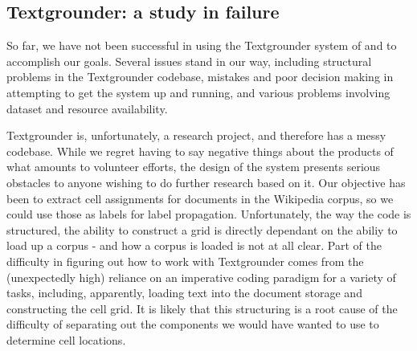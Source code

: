 \subsection{Textgrounder: a study in failure}
So far, we have not been successful in using the Textgrounder system of
\cite{wing-baldridge:11} and \cite{rolleretal:12} to accomplish our goals. 
Several issues stand in our way, including structural problems in the Textgrounder codebase, mistakes and poor decision making in attempting to get the system up and running, and various problems involving dataset and resource availability.
\par
Textgrounder is, unfortunately, a research project, and therefore has a messy
codebase.  
While we regret having to say negative things about the products of what
amounts to volunteer efforts, the design of the system presents serious
obstacles to anyone wishing to do further research based on it.
Our objective has been to extract cell assignments for documents in the
Wikipedia corpus, so we could use those as labels for label propagation.
Unfortunately, the way the code is structured, the ability to construct a grid
is directly dependant on the abiliy to load up a corpus - and how a corpus is
loaded is not at all clear.
Part of the difficulty in figuring out how to work with Textgrounder comes from
the (unexpectedly high) reliance on an imperative coding paradigm for a variety of
tasks, including, apparently, loading text into the document storage and
constructing the cell grid.
It is likely that this structuring is a root cause of the difficulty of
separating out the components we would have wanted to use to determine cell
locations.

